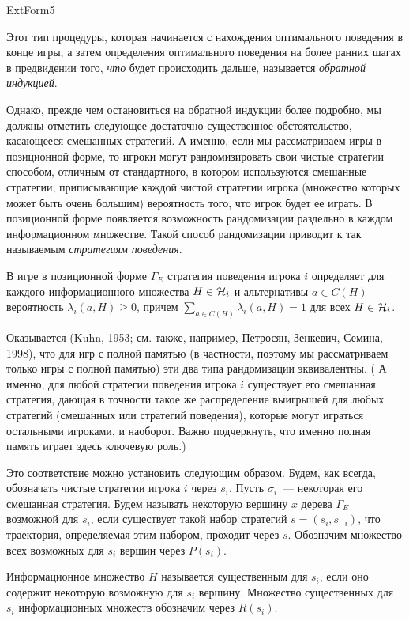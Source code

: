 ExtForm5



Этот тип процедуры, которая начинается с нахождения оптимального
поведения в конце игры, а затем определения оптимального поведения
на более ранних шагах в предвидении того, \emph{что} будет происходить
дальше, называется \emph{обратной индукцией}.

Однако, прежде чем остановиться на обратной индукции более подробно,
мы должны отметить следующее достаточно существенное обстоятельство,
касающееся смешанных стратегий. А именно, если мы рассматриваем игры
в позиционной форме, то игроки могут рандомизировать свои чистые
стратегии способом, отличным от стандартного, в котором используются
смешанные стратегии, приписывающие каждой чистой стратегии игрока
(множество которых может быть очень большим) вероятность того, что
игрок будет ее играть. В позиционной форме появляется возможность
рандомизации раздельно в каждом информационном множестве. Такой
способ рандомизации приводит к так называемым {\it стратегиям
поведения}.

\begin{definition}
В игре в позиционной форме $\Gamma_E$ стратегия поведения игрока $i$
определяет для каждого информационного множества $H\in {\cal H}_i$ и
альтернативы $a\in C(H)$ вероятность $\lambda_i(a,H)\geq 0$, причем
$\sum_{a\in C(H)}\lambda_i(a,H)=1$ для всех $H\in {\cal H}_i$.
\end{definition}

Оказывается (Kuhn, 1953; см. также, например, Петросян, Зенкевич,
Семина, 1998), что для игр с полной памятью (в частности, поэтому мы
рассматриваем только игры с полной памятью) эти два типа
рандомизации эквивалентны. ( А именно, для любой стратегии поведения
игрока $i$ существует его смешанная стратегия, дающая в точности
такое же распределение выигрышей для любых стратегий (смешанных или
стратегий поведения), которые могут играться остальными игроками, и
наоборот. Важно подчеркнуть, что именно полная память
играет здесь ключевую роль.)

Это соответствие можно установить следующим образом. Будем, как
всегда, обозначать чистые стратегии игрока $i$ через $s_i$. Пусть
$\sigma_i$~--- некоторая его смешанная стратегия. Будем называть
некоторую вершину $x$ дерева $\Gamma_E$ возможной для $s_i$, если
существует такой набор стратегий $s=(s_i,s_{-i})$, что траектория,
определяемая этим набором, проходит через $s$. Обозначим множество
всех возможных для $s_i$ вершин через $P(s_i)$.

Информационное множество $H$ называется существенным для $s_i$, если
оно содержит некоторую возможную для $s_i$ вершину. Множество
существенных для $s_i$ информационных множеств обозначим через
$R(s_i)$.

